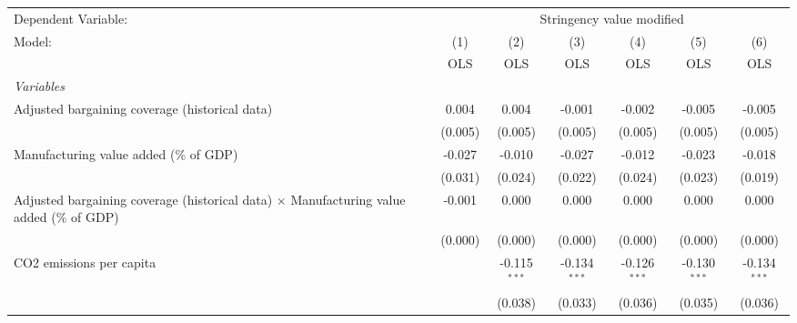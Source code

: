 
\begingroup
\centering
\begin{tabular}{lcccccc}
   \toprule
   Dependent Variable: & \multicolumn{6}{c}{Stringency value modified}\\
   Model:                                                                                          & (1)     & (2)            & (3)            & (4)            & (5)            & (6)\\  
                                                                                                   &  OLS    & OLS            & OLS            & OLS            & OLS            & OLS\\  
   \midrule
   \emph{Variables}\\
   Adjusted bargaining coverage (historical data)                                                  & 0.004   & 0.004          & -0.001         & -0.002         & -0.005         & -0.005\\   
                                                                                                   & (0.005) & (0.005)        & (0.005)        & (0.005)        & (0.005)        & (0.005)\\   
   Manufacturing value added (\% of GDP)                                                           & -0.027  & -0.010         & -0.027         & -0.012         & -0.023         & -0.018\\   
                                                                                                   & (0.031) & (0.024)        & (0.022)        & (0.024)        & (0.023)        & (0.019)\\   
   Adjusted bargaining coverage (historical data) $\times$ Manufacturing value added (\% of GDP)   & -0.001  & 0.000          & 0.000          & 0.000          & 0.000          & 0.000\\   
                                                                                                   & (0.000) & (0.000)        & (0.000)        & (0.000)        & (0.000)        & (0.000)\\   
   CO2 emissions per capita                                                                        &         & -0.115$^{***}$ & -0.134$^{***}$ & -0.126$^{***}$ & -0.130$^{***}$ & -0.134$^{***}$\\   
                                                                                                   &         & (0.038)        & (0.033)        & (0.036)        & (0.035)        & (0.036)\\   

\end{tabular}
